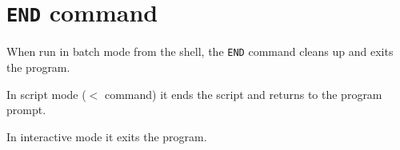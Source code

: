 %
%
%
%
\section{{\tt END} command}
When run in batch mode from the shell, the {\tt END} command cleans up
and exits the program.

In script mode ($<$ command) it ends the script and returns to the
program prompt.

In interactive mode it exits the program.
